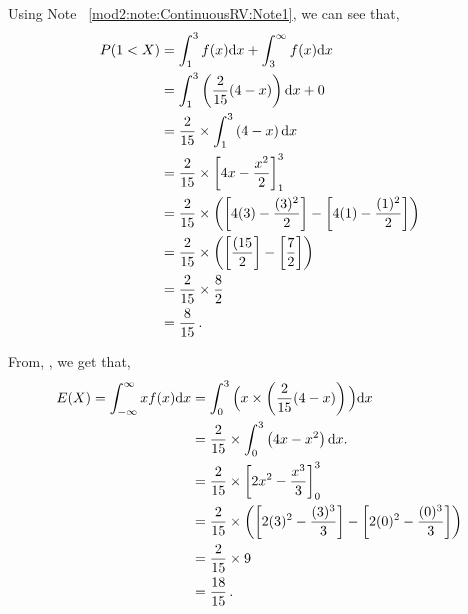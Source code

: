 \begin{subquestions}
\begin{subsubquestions}

\subsubquestion

Using Note ~\ref{mod2:note:ContinuousRV:Note1}, we can see that,
\begin{align}
	P(1<X)  & = \int_1^3 f(x)\mathrm{d}x + \int_3^\infty f(x)\mathrm{d}x\nonumber \\
	& = \int_1^3 \left(\frac{2}{15}(4-x)\right)\mathrm{d}x + 0 \nonumber \\
	& = \frac{2}{15} \times \int_1^3 \left(4-x\right)\mathrm{d}x \nonumber \\
	& = \frac{2}{15} \times \left[ 4x- \frac{x^2}{2}\right]^3_1 \nonumber \\
	& = \frac{2}{15} \times \left( \left[ 4(3)- \frac{(3)^2}{2}\right] -\left[ 4(1)- \frac{(1)^2}{2}\right] \right) \nonumber \\
	& = \frac{2}{15} \times \left( \left[\frac{(15}{2}\right] -\left[ \frac{7}{2}\right] \right) \nonumber \\
	& = \frac{2}{15} \times \frac{8}{2} \nonumber \\
	& = \frac{8}{15} \,.	
\end{align}
	

\subsubquestion

From, , we get that,
\begin{align}
	E(X) = \int_{-\infty}^{\infty}x f(x)\mathrm{d}x & = \int_{0}^{3} \Big(x \times \left( \frac{2}{15}(4-x)\right) \Big)\mathrm{d}x \nonumber \\
	                                        & = \frac{2}{15} \times \int_0^3 \left(4x-x^2 \right)\mathrm{d}x. \nonumber \\
	                                        & = \frac{2}{15} \times \left[ 2x^2 - \frac{x^3}{3} \right]_0^3 \nonumber \\
	                                        & = \frac{2}{15} \times \left( \left[ 2(3)^2 - \frac{(3)^3}{3} \right] - \left[ 2(0)^2 - \frac{(0)^3}{3} \right] \right) \nonumber \\
	                                        & = \frac{2}{15} \times 9 \nonumber \\
	                                        & = \frac{18}{15} \,.
\end{align}



\end{subsubquestions}
\end{subquestions}
